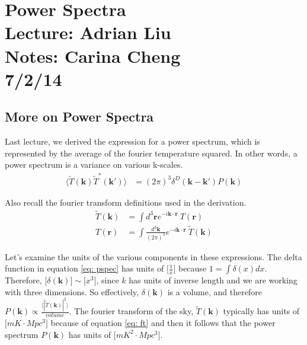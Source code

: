 \documentclass[12pt]{article}
\begin{document}
\pagestyle{empty}

\titleformat{\section}{\normalfont\small\bfseries}{\thesection}{1em}{} 
\titleformat{\subsection}{\normalfont\small\bfseries}{\thesection}{1em}{} 

\section*{Power Spectra \\Lecture: Adrian Liu \\Notes: Carina Cheng \\7/2/14}

\subsection*{More on Power Spectra}

Last lecture, we derived the expression for a power spectrum, which is represented by the average of the fourier temperature squared. In other words, a power spectrum is a variance on various k-scales.
\begin{align} \label{eq: pspec}
\langle \tilde{T}(\boldsymbol{k}) \tilde{T}^{\ast}(\boldsymbol{k'}) \rangle &= (2\pi)^{3}\delta^{D}(\boldsymbol{k}-\boldsymbol{k'})P(\boldsymbol{k})
\end{align}

\noindent Also recall the fourier transform definitions used in the derivation.
\begin{align} \label{eq: ft}
\tilde{T}(\boldsymbol{k}) &= \int d^{3}\boldsymbol{r}e^{-i\boldsymbol{k}\cdot \boldsymbol{r}} \ T(\boldsymbol{r}) \\
\label{eq: ift}
T(\boldsymbol{r}) &= \int {\frac{d^{3}\boldsymbol{k}}{(2\pi)^{3}}}e^{-i\boldsymbol{k}\cdot \boldsymbol{r}} \ \tilde{T}(\boldsymbol{k})
\end{align}

\noindent Let's examine the units of the various components in these expressions. The delta function in equation \ref{eq: pspec} has units of $\Big[{\frac{1}{x}}\Big]$ because $1 = \int \delta(x) dx$. Therefore, $\Big[\delta(\boldsymbol{k})\Big] \sim \Big[x^{3}\Big]$, since $k$ has units of inverse length and we are working with three dimensions. So effectively, $\delta(\boldsymbol{k})$ is a volume, and therefore $P(\boldsymbol{k}) \propto {\frac{\langle |\tilde{T}(\boldsymbol{k})|^{2}\rangle}{volume}}$. The fourier transform of the sky, $\tilde{T}(\boldsymbol{k})$ typically has units of $\Big[mK \cdot Mpc^{3}\Big]$ because of equation \ref{eq: ft} and then it follows that the power spectrum $P(\boldsymbol{k})$ has units of $\Big[mK^{2} \cdot Mpc^{3}\Big]$. \\
\end{document}
